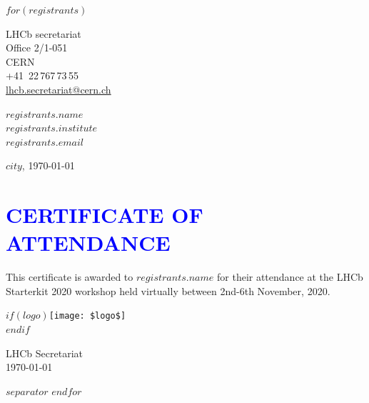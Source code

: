 \documentclass[11pt, a4paper]{article}
\begin{document}
\setlength{\parindent}{0pt}

$for(registrants)$

\begin{minipage}{0.5\textwidth}
  LHCb secretariat\\
  Office 2/1-051\\
  CERN\\
  +41~22\,767\,73\,55\\
  \href{mailto:lhcb.secretariat@cern.ch}{lhcb.secretariat@cern.ch}\\
\end{minipage}%
\hfill%
\begin{minipage}{0.5\textwidth}
  \raggedleft
  $registrants.name$\\
  $registrants.institute$\\
  \href{mailto:$registrants.email$}{$registrants.email$}\\
\end{minipage}




\begin{flushright}
  {\small $city$, \today}
\end{flushright}

\vspace{8em}

\section*{\centering\textcolor{blue}{CERTIFICATE OF ATTENDANCE}}

\vspace{2em}

This certificate is awarded to \textbf{$registrants.name$} for their attendance at the LHCb Starterkit 2020 workshop held virtually between 2nd-6th November, 2020.

\vspace{10em}
\begin{minipage}[b]{0.5\textwidth}
  $if(logo)$\texttt{[image: \$logo\$]}\\$endif$
\end{minipage}
\begin{minipage}[b]{0.5\textwidth}
  \raggedleft
  LHCb Secretariat \\
  \today
\end{minipage}

$separator$\pagebreak
$endfor$
\end{document}
